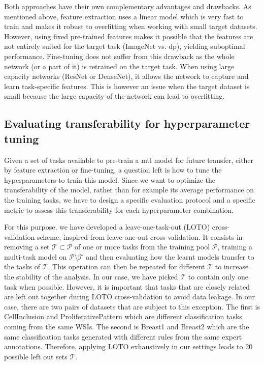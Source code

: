 Both approaches have their own complementary advantages and drawbacks. As mentioned above, feature extraction uses a linear model which is very fast to train and makes it robust to overfitting when working with small target datasets. However, using fixed pre-trained features makes it possible that the features are not entirely suited for the target task (\eg ImageNet vs. \acrlong{dp}), yielding suboptimal performance. Fine-tuning does not suffer from this drawback as the whole network (or a part of it) is retrained on the target task. When using large capacity networks (\eg ResNet or DenseNet), it allows the network to capture and learn task-specific features. This is however an issue when the target dataset is small because the large capacity of the network can lead to overfitting.

\subsection{Evaluating transferability for hyperparameter tuning}
\label{ssec:mtask:exp:transfer_eval}\label{ssec:mtask:exp:model_selection}

Given a set of tasks available to pre-train a \acrshort{mtl} model for future transfer, either by feature extraction or fine-tuning, a question left is how to tune the hyperparameters to train this model. Since we want to optimize the transferability of the model, rather than for example its average performance on the training tasks, we have to design a specific evaluation protocol and a specific metric to assess this transferability for each hyperparameter combination.

For this purpose, we have developed a leave-one-task-out (LOTO) cross-validation scheme, inspired from leave-one-out cross-validation. It consists in removing a set $\mathcal{T} \subset \mathcal{P}$ of one or more tasks from the training pool $\mathcal{P}$, training a multi-task model on $\mathcal{P} \setminus \mathcal{T}$ and then evaluating how the learnt models transfer to the tasks of $\mathcal{T}$. This operation can then be repeated for different $\mathcal{T}$ to increase the stability of the analysis. In our case, we have picked $\mathcal{T}$ to contain only one task when possible. However, it is important that tasks that are closely related are left out together during LOTO cross-validation to avoid data leakage. In our case, there are two pairs of datasets that are subject to this exception. The first is CellInclusion and ProliferativePattern which are different classification tasks coming from the same WSIs. The second is Breast1 and Breast2 which are the same classification tasks generated with different rules from the same expert annotations. Therefore, applying LOTO exhaustively in our settings leads to 20 possible left out sets $\mathcal{T}$. 

